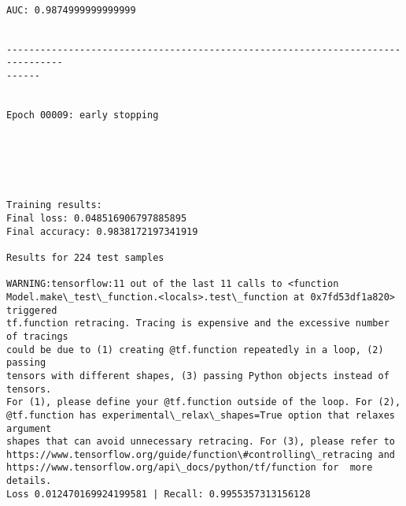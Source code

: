 \documentclass[11pt]{article}
\begin{document}
    \begin{center}
    \end{center}
    { \hspace*{\fill} \\}
    
    \begin{Verbatim}[commandchars=\\\{\}]
AUC: 0.9874999999999999


--------------------------------------------------------------------------------
------


Epoch 00009: early stopping
    \end{Verbatim}

    \begin{center}
    \end{center}
    { \hspace*{\fill} \\}
    
    \begin{center}
    \end{center}
    { \hspace*{\fill} \\}
    
    \begin{Verbatim}[commandchars=\\\{\}]

Training results:
Final loss: 0.048516906797885895
Final accuracy: 0.9838172197341919

Results for 224 test samples

WARNING:tensorflow:11 out of the last 11 calls to <function
Model.make\_test\_function.<locals>.test\_function at 0x7fd53df1a820> triggered
tf.function retracing. Tracing is expensive and the excessive number of tracings
could be due to (1) creating @tf.function repeatedly in a loop, (2) passing
tensors with different shapes, (3) passing Python objects instead of tensors.
For (1), please define your @tf.function outside of the loop. For (2),
@tf.function has experimental\_relax\_shapes=True option that relaxes argument
shapes that can avoid unnecessary retracing. For (3), please refer to
https://www.tensorflow.org/guide/function\#controlling\_retracing and
https://www.tensorflow.org/api\_docs/python/tf/function for  more details.
Loss 0.012470169924199581 | Recall: 0.9955357313156128



    \end{Verbatim}
\end{document}
